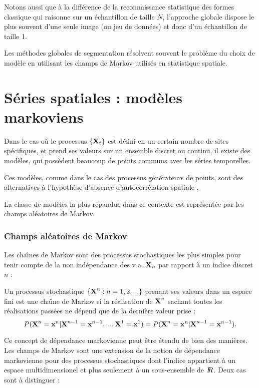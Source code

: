 Notons aussi que \`a la diff\'erence de la reconnaissance statistique des formes 
classique qui raisonne sur un \'echantillon
de taille $N$, l'approche globale dispose le plus souvent d'une seule image
(ou jeu de donn\'ees) et donc d'un \'echantillon de taille 1.

Les m\'ethodes globales de segmentation  r\'esolvent souvent le probl\`eme
du choix de mod\`ele en utilisant les champs de Markov 
utilis\'es en statistique spatiale.

\section{S\'eries spatiales : mod\`eles markoviens}
Dans le cas o\`u le processus $\{\mbox{\bf X}_t\}$ est d\'efini en un certain nombre
de sites sp\'ecifiques, et prend ses valeurs sur un ensemble discret
ou continu, il existe des mod\`eles, qui poss\`edent beaucoup 
de points communs avec les s\'eries temporelles. 

Ces mod\`eles, comme dans le cas des processus g\'en\'erateurs de points, sont
des alternatives \`a l'hypoth\`ese d'absence d'autocorr\'elation spatiale 
\cite{Ord1982}.

La classe de mod\`eles la plus r\'epandue  dans ce contexte est 
repr\'esent\'ee par les champs al\'eatoires de Markov.

\subsubsection{Champs al\'eatoires de Markov}

Les cha\^{\i}nes de Markov sont des processus stochastiques les plus
simples pour tenir compte de la non ind\'ependance des v.a. $\mbox{\bf X}_n$ par
rapport \`a un indice discret $n$ :

\begin{defi}
Un processus stochastique $\{\mbox{\bf X}^n: n=1,2,...\}$ prenant ses valeurs
dans un espace fini est une cha\^{\i}ne de Markov si
la r\'ealisation de $\mbox{\bf X}^n$ sachant toutes les r\'ealisations pass\'ees
ne d\'epend que de la derni\`ere valeur prise :
\begin{equation}
P(\mbox{\bf X}^n=\mbox{\bf x}^n | \mbox{\bf X}^{n-1}=\mbox{\bf x}^{n-1},...,\mbox{\bf X}^{1}=\mbox{\bf x}^{1})=P(\mbox{\bf X}^n=\mbox{\bf x}^n | \mbox{\bf X}^{n-1}=\mbox{\bf x}^{n-1}).
\end{equation}  
\end{defi}


Ce concept de d\'ependance markovienne  peut \^etre \'etendu de bien
des mani\`eres. Les champs de Markov sont une extension de la
notion de d\'ependance markovienne pour des processus stochastiques dont 
l'indice appartient \`a un espace multidimensionel et plus seulement \`a un
sous-ensemble de $I\!\!R$.  Deux cas sont \`a distinguer :

